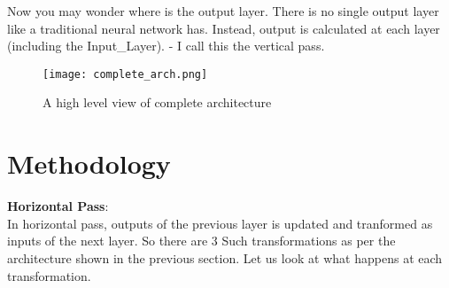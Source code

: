 \documentclass[11pt,a4paper]{report}
\begin{document}
Now you may wonder where is the output layer. There is no single output layer like a traditional neural network has. Instead, output is calculated at each layer (including the Input\_Layer). - I call this the vertical pass. 

\begin{figure}[H]
	\centering
	\caption{A high level view of complete architecture}
	\label{complete_arch}
	\texttt{[image: complete\_arch.png]}
\end{figure}

\section{Methodology}

\textbf{Horizontal Pass}:\\

In horizontal pass, outputs of the previous layer is updated and tranformed as inputs of the next layer. So there are 3 Such transformations as per the architecture shown in the previous section. Let us look at what happens at each transformation.
 
\end{document}
